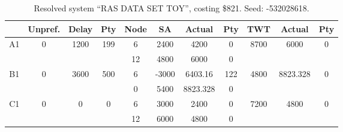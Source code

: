 \begin{sidewaystable}
\footnotesize
\caption{Resolved system ``RAS DATA SET TOY'', costing \$821. Seed: -532028618.}
\centering
\begin{tabular}{c||c|c|c||c|c|c|c||c|c|c}
  \hline \hline
  &
  Unpref. & 
  Delay &
  Pty &
  Node &
  SA &
  Actual &
  Pty &
  TWT &
  Actual &
  Pty \\
      \hline
      \multirow{2}{*}{A1} &
      \multirow{2}{*}{0} &
      \multirow{2}{*}{1200} &
      \multirow{2}{*}{199} &
      6 &
      2400 &
        4200 &
        0 &
      \multirow{2}{*}{8700} &
        \multirow{2}{*}{6000} &
        \multirow{2}{*}{0}
      \\
      \cline{5-8}
       &
       &
       &
       &
      12 &
      4800 &
        6000 &
        0 &
      
         &
        
      \\
      \hline
      \multirow{2}{*}{B1} &
      \multirow{2}{*}{0} &
      \multirow{2}{*}{3600} &
      \multirow{2}{*}{500} &
      6 &
      -3000 &
        6403.16 &
        122 &
      \multirow{2}{*}{4800} &
        \multirow{2}{*}{8823.328} &
        \multirow{2}{*}{0}
      \\
      \cline{5-8}
       &
       &
       &
       &
      0 &
      5400 &
        8823.328 &
        0 &
      
         &
        
      \\
      \hline
      \multirow{2}{*}{C1} &
      \multirow{2}{*}{0} &
      \multirow{2}{*}{0} &
      \multirow{2}{*}{0} &
      6 &
      3000 &
        2400 &
        0 &
      \multirow{2}{*}{7200} &
        \multirow{2}{*}{4800} &
        \multirow{2}{*}{0}
      \\
      \cline{5-8}
       &
       &
       &
       &
      12 &
      6000 &
        4800 &
        0 &
      
         &
        
      \\
\end{tabular}
\label{table:RASDATASETTOY} 
\end{sidewaystable}